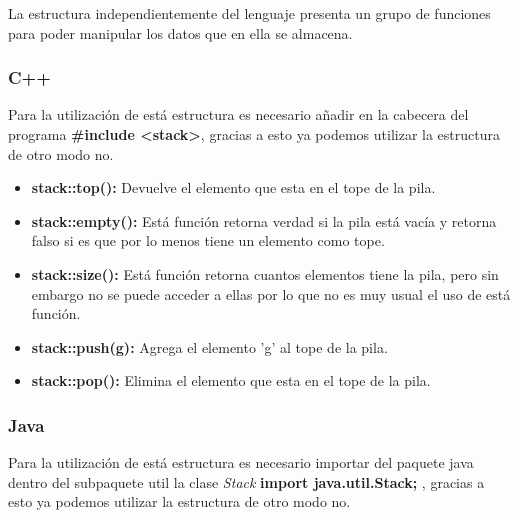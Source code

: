La estructura independientemente del lenguaje presenta un grupo de funciones para poder manipular los datos que en ella se almacena.

\subsubsection{C++}

Para la utilización de está estructura es necesario añadir en la cabecera del programa \textbf{\#include
	<stack>}, gracias a esto ya podemos utilizar la estructura de otro modo no.

\begin{itemize}
	\item \textbf{stack::top():} Devuelve el elemento que esta en el tope de la pila.
	\item \textbf{stack::empty():} Está función retorna verdad si la pila está vacía y retorna falso si es que por lo menos
	tiene un elemento como tope.
	\item \textbf{stack::size():} Está función retorna cuantos elementos tiene la pila, pero sin embargo no se puede
	acceder a ellas por lo que no es muy usual el uso de está función.
	\item \textbf{stack::push(g):} Agrega el elemento 'g' al tope de la pila.
	\item \textbf{stack::pop():} Elimina el elemento que esta en el tope de la pila.
\end{itemize}

\subsubsection{Java}

Para la utilización de está estructura es necesario importar del paquete java dentro del subpaquete util la clase \emph{Stack} \textbf{import java.util.Stack;} , gracias a esto ya podemos utilizar la estructura de otro modo no.

